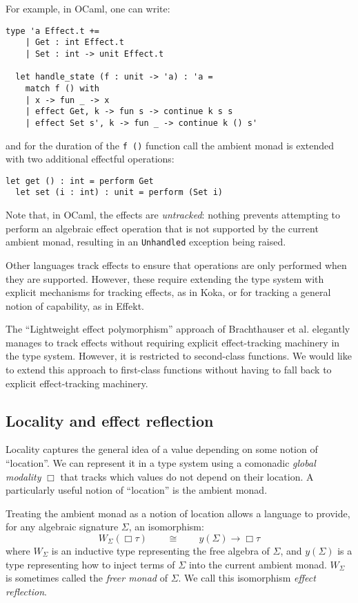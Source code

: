 \documentclass[acmsmall, screen, nonacm]{acmart}
\theoremstyle{definition}
\newcommand{\glob}{\mathop{\Box}}
\newcommand{\yoneda}[1]{y(#1)}
\newcommand{\ind}[1]{W_{#1}}
\begin{document}
For example, in OCaml, one can write:
\begin{lstlisting}[style=oxcaml]
  type 'a Effect.t +=
    | Get : int Effect.t
    | Set : int -> unit Effect.t

  let handle_state (f : unit -> 'a) : 'a =
    match f () with
    | x -> fun _ -> x
    | effect Get, k -> fun s -> continue k s s
    | effect Set s', k -> fun _ -> continue k () s'
\end{lstlisting}
and for the duration of the \lstinline[style=oxcaml]{f ()} function call
the ambient monad is extended with two additional effectful operations:
\begin{lstlisting}[style=oxcaml]
  let get () : int = perform Get
  let set (i : int) : unit = perform (Set i)
\end{lstlisting}

Note that, in OCaml, the effects are \emph{untracked}: nothing prevents
attempting to perform an algebraic effect operation that is not
supported by the current ambient monad, resulting in an
\lstinline[style=oxcaml]{Unhandled} exception being raised.

Other languages track effects to ensure that operations are only
performed when they are supported. However, these require extending the
type system with explicit mechanisms for tracking effects, as in
Koka\cite{leijen2017type}, or for tracking a general notion of
capability, as in Effekt\cite{brachthauser2022effects}.

The ``Lightweight effect polymorphism'' approach of Brachthauser et
al. elegantly manages to track effects without requiring explicit
effect-tracking machinery in the type system. However, it is restricted
to second-class functions. We would like to extend this approach to
first-class functions without having to fall back to explicit
effect-tracking machinery.

\subsection{Locality and effect reflection}
Locality captures the general idea of a value depending on some notion
of ``location''. We can represent it in a type system using a comonadic
\emph{global modality} $\glob$ that tracks which values do not depend on
their location. A particularly useful notion of ``location'' is the
ambient monad.

Treating the ambient monad as a notion of location allows a language to
provide, for any algebraic signature $\Sigma$, an isomorphism:
\begin{equation*}
  \ind{\Sigma}(\glob \tau) \qquad \cong \qquad \yoneda{\Sigma} \rightarrow \glob \tau
\end{equation*}
where $\ind{\Sigma}$ is an inductive type representing the free
algebra of $\Sigma$, and $\yoneda{\Sigma}$ is a type representing how
to inject terms of $\Sigma$ into the current ambient
monad. $\ind{\Sigma}$ is sometimes called the \emph{freer monad} of
$\Sigma$. We call this isomorphism \emph{effect reflection}.
\end{document}
